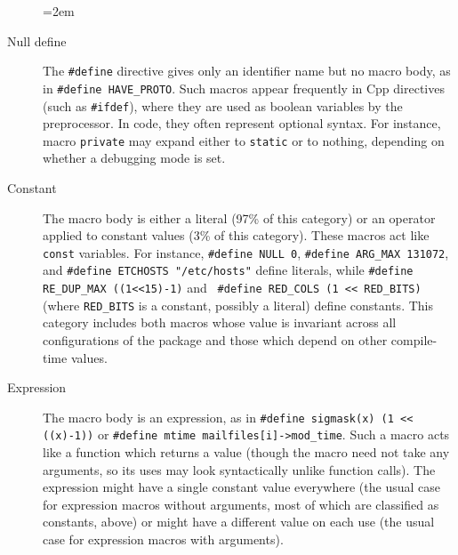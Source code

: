 

\begin{description}
  \sloppy
  \emergencystretch=2em

\item[Null define]  The {\tt \#define} directive gives only an
  identifier name but no macro body, as in {\tt \#define
  \verb|HAVE_PROTO|}\@.  Such macros appear frequently in Cpp
directives (such as {\tt \#ifdef}), where they are used as boolean
variables by the preprocessor.  In code, they often represent optional
syntax.  For instance,
macro {\tt private} may expand either to {\tt static} or to nothing,
depending on whether a debugging mode is set.

\item[Constant] The macro body is either a literal (97\% of this category)
  or an operator applied to constant values (3\% of this category).
  These macros act like {\tt const} variables. 
  For instance, {\tt \#define NULL 0}, {\tt \#define \verb|ARG_MAX|
  131072}, and {\tt \#define ETCHOSTS "/etc/hosts"} define literals, while
{\tt \#define \verb|RE_DUP_MAX| ((1<<15)-1)} and {\tt
\#define \verb|RED_COLS| (1 << \verb|RED_BITS|)} (where \verb|RED_BITS| is
a constant, possibly a literal) define constants.  This category includes
both macros whose value is invariant across all configurations of the
package and those which depend on other compile-time values.  

\item[Expression]  The macro body is an expression, as in {\tt \#define
  sigmask(x) (1 << ((x)-1))} or {\tt \#define mtime mailfiles[i]->\verb|mod_time|}.
Such a macro acts like a function which returns a value (though the
macro need not take any arguments, so its uses may look syntactically
unlike function calls). 
The expression might have a single constant value everywhere (the usual
case for expression macros without arguments, most of which are classified
as constants, above) or might have a different value on each use (the usual
case for expression macros with arguments).


\end{description}
